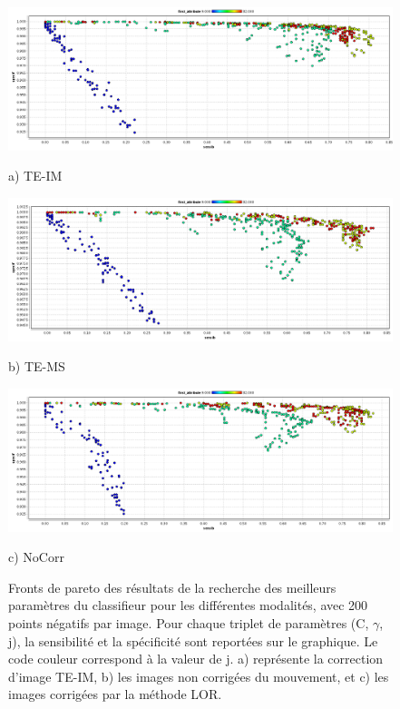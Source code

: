 \begin{figure}[h!]

\begin{center}
 \includegraphics[width=14cm]{images/pareto_mod_IM.png}

{\small a) TE-IM}
\vspace{0.5cm}

\includegraphics[width=14cm]{images/pareto_mod_LOR.png}
 
{\small b) TE-MS}
\vspace{0.5cm}

\includegraphics[width=14cm]{images/pareto_mod_NoCorr.png}

{\small c) NoCorr}

\end{center}
 \caption{Fronts de pareto des résultats de la recherche des meilleurs paramètres du classifieur pour les différentes modalités, avec 200 points négatifs par image. Pour chaque triplet de paramètres (C, $\gamma$, j), la sensibilité et la spécificité sont reportées sur le graphique. Le code couleur correspond à la valeur de j. a) représente la correction d'image TE-IM, b) les images non corrigées du mouvement, et c) les images corrigées par la méthode LOR.}
\label{fig:paretoModalite} 
\end{figure}








